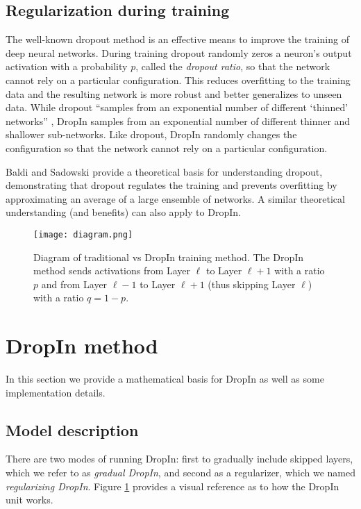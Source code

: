 \documentclass[10pt,twocolumn,letterpaper]{article}
\newcommand{\dropin}{DropIn }
\newcommand{\dropinNS}{DropIn}
\begin{document}
\subsection{Regularization during training}
The well-known dropout \cite{hinton2012improving, srivastava2014dropout} method is an effective means to improve the training  of deep neural networks.   
During training dropout randomly zeros a neuron's output activation with a probability $p$, called the \textit{dropout ratio},  so that the network cannot rely on a particular configuration.
This reduces overfitting to the training data and the resulting network is more robust and better generalizes to unseen data.  
While dropout ``samples from an exponential number of different `thinned' networks'' \cite{srivastava2014dropout}, \dropin samples from an exponential number of different thinner and shallower sub-networks.
Like dropout, \dropin randomly changes the configuration so that the network cannot rely on a particular configuration. 

Baldi and Sadowski \cite{baldi2013understanding} provide a theoretical basis for understanding dropout,  demonstrating that dropout regulates the training and prevents overfitting by approximating an average of a  large ensemble of networks.  
A similar theoretical understanding (and benefits) can also apply to \dropinNS.



\begin{figure}[tb]
\begin{center}
   \texttt{[image: diagram.png]}
\end{center}
  \vspace{-10pt}
   \caption{Diagram of traditional vs \dropin training method.  The \dropin method sends activations from Layer $ {\ell} $ to Layer $ {\ell+1} $ with a ratio $p$ and from Layer $ {\ell-1} $ to Layer $ {\ell+1}$ (thus skipping Layer $\ell$) with a ratio $q=1-p$.
}
\label{fig:diagram}
  \vspace{-10pt}
\end{figure}


\section{\dropin method}
In this section we provide a mathematical basis for \dropin as well as some implementation details.

\subsection{Model description}
\label{sec:model}
There are two modes of running \dropinNS: first to gradually include skipped layers, which we refer to as \textit{gradual \dropinNS}, and second as a regularizer, which we named \textit{regularizing \dropinNS}.
Figure \ref{fig:diagram} provides a visual reference as to how the \dropin unit works.
\end{document}
